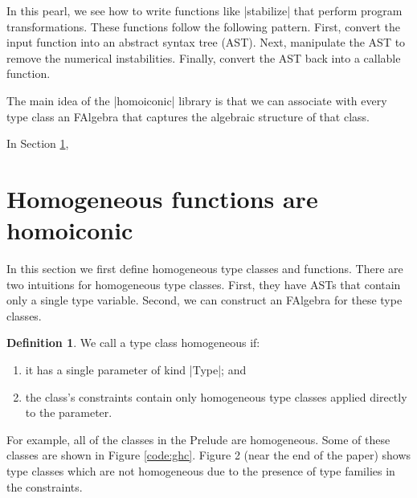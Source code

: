\documentclass[preprint]{sigplanconf}
\theoremstyle{definition}
\newtheorem{defn}{Definition}
\begin{document}
In this pearl, we see how to write functions like |stabilize| that perform program transformations.
These functions follow the following pattern.
First, convert the input function into an abstract syntax tree (AST).
Next, manipulate the AST to remove the numerical instabilities.
Finally, convert the AST back into a callable function.

The main idea of the |homoiconic| library is that we can associate with every type class an FAlgebra that captures the algebraic structure of that class.

In Section \ref{sec:homogeneous},

\section{Homogeneous functions are homoiconic}
\label{sec:homogeneous}

In this section we first define homogeneous type classes and functions.
There are two intuitions for homogeneous type classes.
First, they have ASTs that contain only a single type variable.
Second, we can construct an FAlgebra for these type classes.

\begin{defn}
We call a type class homogeneous if:
\begin{enumerate}
\item
it has a single parameter of kind |Type|; and
\item
the class's constraints contain only homogeneous type classes applied directly to the parameter.
\end{enumerate}
For example, all of the classes in the Prelude are homogeneous.
Some of these classes are shown in Figure \ref{code:ghc}.
Figure 2 (near the end of the paper) shows type classes which are not homogeneous due to the presence of type families in the constraints.
\end{defn}
\end{document}
